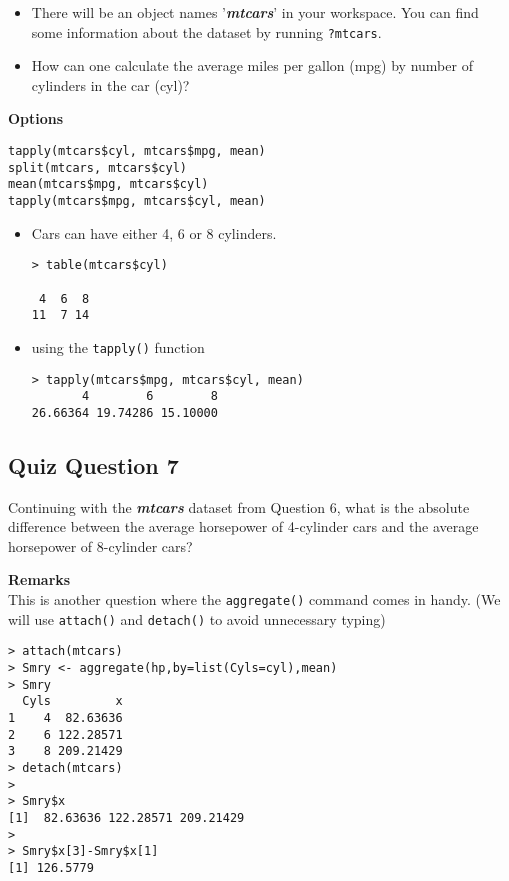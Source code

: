 \documentclass[12pt]{article}
\begin{document}
\begin{itemize}
\item There will be an object names '\textit{\textbf{mtcars}}' in your workspace. You can find some information about the dataset by running
\texttt{?mtcars}.

\item How can one calculate the average miles per gallon (mpg) by number of cylinders in the car (cyl)?
\end{itemize}
\textbf{Options}
\begin{verbatim}
tapply(mtcars$cyl, mtcars$mpg, mean)
split(mtcars, mtcars$cyl)
mean(mtcars$mpg, mtcars$cyl)
tapply(mtcars$mpg, mtcars$cyl, mean)
\end{verbatim}

\begin{itemize}
\item Cars can have either 4, 6 or 8 cylinders.
\begin{verbatim}
> table(mtcars$cyl)

 4  6  8 
11  7 14 
\end{verbatim}
\item using the \texttt{tapply()} function
\begin{verbatim}
> tapply(mtcars$mpg, mtcars$cyl, mean)
       4        6        8 
26.66364 19.74286 15.10000
\end{verbatim}
\end{itemize}
\newpage
\subsection{Quiz Question 7}
Continuing with the \textit{\textbf{mtcars}} dataset from Question 6, what is the absolute difference between the average horsepower of 4-cylinder cars and the average horsepower of 8-cylinder cars?

\bigskip
\textbf{Remarks}\\
This is another question where the \texttt{aggregate()} command comes in handy. (We will use \texttt{attach()} and \texttt{detach()} to avoid unnecessary typing)
\begin{verbatim}
> attach(mtcars)
> Smry <- aggregate(hp,by=list(Cyls=cyl),mean)
> Smry 
  Cyls         x
1    4  82.63636
2    6 122.28571
3    8 209.21429
> detach(mtcars)
>
> Smry$x
[1]  82.63636 122.28571 209.21429
>
> Smry$x[3]-Smry$x[1]
[1] 126.5779
\end{verbatim}


\newpage
\end{document}
